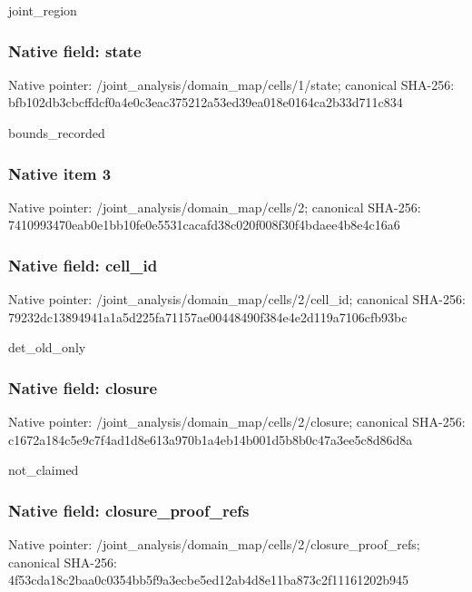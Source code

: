 \documentclass[10pt,a4paper]{article}
\begin{document}
joint\_region


\subsubsection{Native field: state}


Native pointer: /joint\_analysis/domain\_m\allowbreak{}ap/cells/1/state; canonical SHA-256: bfb102db3cbcffdcf0a4e0c3\allowbreak{}eac375212a53ed39ea018e01\allowbreak{}64ca2b33d711c834


bounds\_recorded


\subsubsection{Native item 3}


Native pointer: /joint\_analysis/domain\_map/cells/2; canonical SHA-256: 7410993470eab0e1bb10fe0e\allowbreak{}5531cacafd38c020f008f30f\allowbreak{}4bdaee4b8e4c16a6



\subsubsection{Native field: cell\_id}


Native pointer: /joint\_analysis/domain\_m\allowbreak{}ap/cells/2/cell\_id; canonical SHA-256: 79232dc13894941a1a5d225f\allowbreak{}a71157ae00448490f384e4e2\allowbreak{}d119a7106cfb93bc


det\_old\_only


\subsubsection{Native field: closure}


Native pointer: /joint\_analysis/domain\_m\allowbreak{}ap/cells/2/closure; canonical SHA-256: c1672a184c5e9c7f4ad1d8e6\allowbreak{}13a970b1a4eb14b001d5b8b0\allowbreak{}c47a3ee5c8d86d8a


not\_claimed


\subsubsection{Native field: closure\_proof\_refs}


Native pointer: /joint\_analysis/domain\_m\allowbreak{}ap/cells/2/closure\_proof\allowbreak{}\_refs; canonical SHA-256: 4f53cda18c2baa0c0354bb5f\allowbreak{}9a3ecbe5ed12ab4d8e11ba87\allowbreak{}3c2f11161202b945
\end{document}
